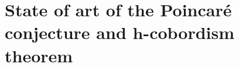 



\section[State of art]{State of art of the Poincaré conjecture and $\bm{h}$-cobordism theorem}

\label{sec:history}

